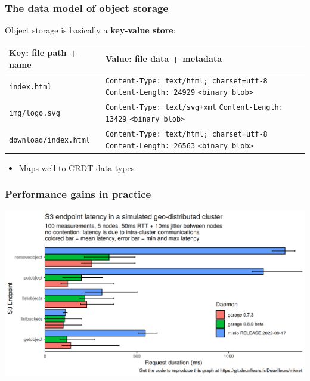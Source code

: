 \documentclass[aspectratio=169]{beamer}
\begin{document}
\begin{frame}
	\frametitle{The data model of object storage}
	Object storage is basically a \textbf{key-value store}:
	\vspace{.5em}

	{\scriptsize
		\begin{center}
		\begin{tabular}{|l|p{7cm}|}
			\hline
			\textbf{Key: file path + name} & \textbf{Value: file data + metadata} \\
			\hline
			\hline
			\texttt{index.html} &
				\texttt{Content-Type: text/html; charset=utf-8} \newline
				\texttt{Content-Length: 24929} \newline
				\texttt{<binary blob>} \\ 
			\hline
			\texttt{img/logo.svg} &
				\texttt{Content-Type: text/svg+xml} \newline
				\texttt{Content-Length: 13429} \newline
				\texttt{<binary blob>} \\ 
			\hline
			\texttt{download/index.html} &
				\texttt{Content-Type: text/html; charset=utf-8} \newline
				\texttt{Content-Length: 26563} \newline
				\texttt{<binary blob>} \\ 
			\hline
		\end{tabular}
		\end{center}
		}

	\vspace{1em}
	\begin{itemize}
		\item<2> Maps well to CRDT data types
	\end{itemize}
\end{frame}

\begin{frame}
	\frametitle{Performance gains in practice}
	\begin{center}
		\includegraphics[width=.8\linewidth]{../assets/perf/endpoint_latency_0.7_0.8_minio.png}
	\end{center}
\end{frame}
\end{document}
